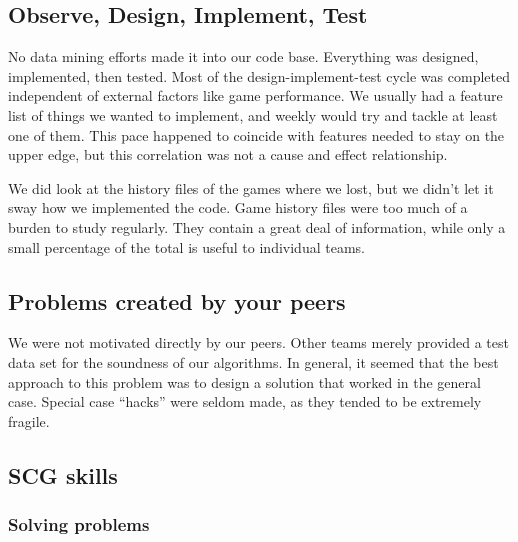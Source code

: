 \documentclass[letterpaper,12pt,oneside]{article}
\begin{document}
\subsection{Observe, Design, Implement, Test}
No data mining efforts made it into our code base. Everything
was designed, implemented, then tested. Most of the design-implement-test cycle
was completed independent of external factors like game performance. We usually
had a feature list of things we wanted to implement, and weekly would try and
tackle at least one of them. This pace happened to coincide with features
needed to stay on the upper edge, but this correlation was not a cause and
effect relationship.

We did look at the history files of the games where we lost, but we didn't
let it sway how we implemented the code. Game history files were too much of
a burden to study regularly. They contain a great deal of information, while
only a small percentage of the total is useful to individual teams.

\subsection{Problems created by your peers}
We were not motivated directly by our peers. Other teams merely provided a test
data set for the soundness of our algorithms. In general, it seemed that the
best approach to this problem was to design a solution that worked in the
general case. Special case ``hacks'' were seldom made, as they tended to be
extremely fragile. 

\subsection{SCG skills}

\subsubsection{Solving problems}
\end{document}

